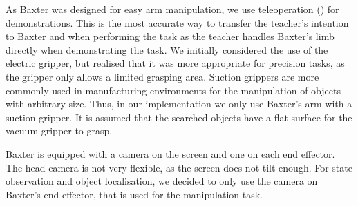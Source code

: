 As Baxter was designed for easy arm manipulation, we use teleoperation () for demonstrations.
This is the most accurate way to transfer the teacher's intention to Baxter and when performing the task as the teacher handles Baxter's limb directly when demonstrating the task.
We initially considered the use of the electric gripper, but realised that it was more appropriate for precision tasks, as the gripper only allows a limited grasping area.
Suction grippers are more commonly used in manufacturing environments for the manipulation of objects with arbitrary size.
Thus, in our implementation we only use Baxter's arm with a suction gripper.
It is assumed that the searched objects have a flat surface for the vacuum gripper to grasp.

Baxter is equipped with a camera on the screen and one on each end effector.
The head camera is not very flexible, as the screen does not tilt enough.
For state observation and object localisation, we decided to only use the camera on Baxter's end effector, that is used for the manipulation task.


